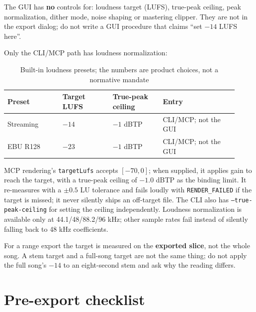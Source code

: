The GUI has \textbf{no} controls for: loudness target (LUFS), true-peak ceiling, peak normalization, dither mode, noise shaping or mastering clipper. They are not in the export dialog; do not write a GUI procedure that claims ``set $-14$ LUFS here''.

Only the CLI/MCP path has loudness normalization:

\begin{table}[htbp]
\centering
\small
\begin{tabular}{@{}p{0.22\linewidth}p{0.20\linewidth}p{0.20\linewidth}p{0.30\linewidth}@{}}
\hline
Preset & Target LUFS & True-peak ceiling & Entry \\
\hline
Streaming & $-14$ & $-1$ dBTP & CLI/MCP; not the GUI \\
EBU R128 & $-23$ & $-1$ dBTP & CLI/MCP; not the GUI \\
\hline
\end{tabular}
\caption{Built-in loudness presets; the numbers are product choices, not a normative mandate}
\label{tab:loudness-presets}
\end{table}

MCP rendering's \texttt{targetLufs} accepts $[-70,0]$; when supplied, it applies gain to reach the target, with a true-peak ceiling of $-1.0$ dBTP as the binding limit. It re-measures with a $\pm0.5$ LU tolerance and fails loudly with \texttt{RENDER\_FAILED} if the target is missed; it never silently ships an off-target file. The CLI also has \texttt{--true-peak-ceiling} for setting the ceiling independently. Loudness normalization is available only at 44.1/48/88.2/96 kHz; other sample rates fail instead of silently falling back to 48 kHz coefficients.

For a range export the target is measured on the \textbf{exported slice}, not the whole song. A stem target and a full-song target are not the same thing; do not apply the full song's $-14$ to an eight-second stem and ask why the reading differs.

\section{Pre-export checklist}

